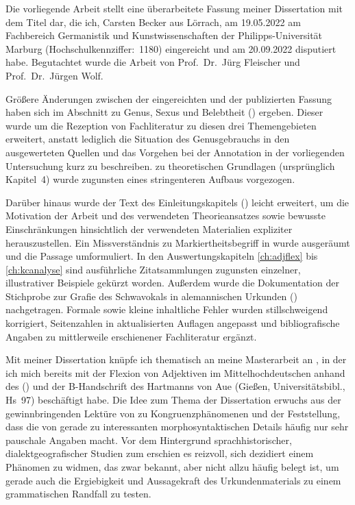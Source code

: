 \addchap{\lsPrefaceTitle}

Die vorliegende Arbeit stellt eine überarbeitete Fassung meiner Dissertation
mit dem Titel  dar, die ich, Carsten Becker aus Lörrach, am
19.05.2022 am Fachbereich Germanistik und Kunstwissenschaften der
Philipps-Universität Marburg (Hochschulkennziffer:~1180) eingereicht und am
20.09.2022 disputiert habe. Begutachtet wurde die Arbeit von Prof.~Dr.~Jürg
Fleischer und Prof.~Dr.~Jürgen Wolf.

Größere Änderungen zwischen der eingereichten und der publizierten Fassung
haben sich im Abschnitt zu Genus, Sexus und Belebtheit ()
ergeben. Dieser wurde um die Rezeption von Fachliteratur zu diesen drei
Themengebieten erweitert, anstatt lediglich die Situation des Genusgebrauchs in
den ausgewerteten Quellen und das Vorgehen bei der Annotation in der
vorliegenden Untersuchung kurz zu beschreiben.  zu
theoretischen Grundlagen (ursprünglich Kapitel~4) wurde zugunsten eines
stringenteren Aufbaus vorgezogen.

Darüber hinaus wurde der Text des Einleitungskapitels ()
leicht erweitert, um die Motivation der Arbeit und des verwendeten
Theorieansatzes sowie bewusste Einschränkungen hinsichtlich der verwendeten
Materialien expliziter herauszustellen. Ein Missverständnis zu
 Markiertheitsbegriff in 
wurde ausgeräumt und die Passage umformuliert. In den Auswertungs\-kapi\-teln
\ref{ch:adjflex} bis \ref{ch:kcanalyse} sind ausführliche Zitatsammlungen
zugunsten einzelner, illustrativer Beispiele gekürzt worden. Außerdem wurde die
Dokumentation der Stich\-probe zur Grafie des Schwa\-vokals in alemannischen
Urkunden () nachgetragen. Formale sowie kleine
inhaltliche Fehler wurden stillschweigend korrigiert, Seitenzahlen in
aktualisierten Auflagen angepasst und bibliografische Angaben zu mittlerweile
erschienener Fachliteratur ergänzt.

Mit meiner Dissertation knüpfe ich thematisch an meine Masterarbeit an
\autocite{becker2016}, in der ich mich bereits mit der Flexion von Adjektiven
im Mittelhochdeutschen anhand des  (\CAO) und der B-Handschrift des  Hartmanns von
Aue (Gießen, Universitätsbibl., Hs~97) beschäftigt habe. Die Idee zum Thema der
Dissertation erwuchs aus der gewinnbringenden Lektüre von \citet{corbett2006}
zu Kongruenz\-phänomenen und der Feststellung, dass die  von \citet{paul2007} gerade zu interessanten morpho\-syntaktischen
Details häufig nur sehr pauschale Angaben macht. Vor dem Hintergrund
sprach\-historischer, dialekt\-geografischer Studien zum \CAO{}
\autocite{beckerschallert2021,beckerschallert2022a, beckerschallert2022b}
erschien es reizvoll, sich dezidiert einem Phänomen zu widmen, das zwar bekannt,
aber nicht allzu häufig belegt ist, um gerade auch die Ergiebigkeit und
Aussagekraft des Urkunden\-materials zu einem grammatischen Randfall zu testen.

